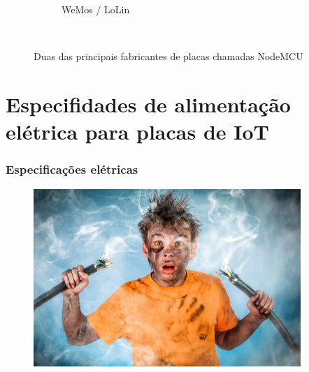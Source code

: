 \documentclass{beamer}
\begin{document}
\begin{frame}
\begin{minipage}{\textwidth}
\begin{figure}
\begin{subfigure}[b]{0.25\textwidth}
			\caption{WeMos / LoLin}
			\label{fig:node_mcudf}
		\end{subfigure}
		~ %
		\caption{Duas das principais fabricantes de placas chamadas NodeMCU}\label{fig:placa_sdfsiot}
		\vspace{-20pt}
	\end{figure}
	
	
\end{minipage}
\end{frame} 



\section{Especifidades de alimentação elétrica para placas de IoT}


\begin{frame}
\frametitle{Especificações elétricas}
\begin{minipage}{\textwidth}
	
		\begin{figure}[!ht]
			\centering
			\includegraphics[width=0.9\textwidth]{menino-choque.jpg}
			\label{fig:ndfgodsdfsde_power_pins}
			\vspace{-10pt}
		\end{figure}

\end{minipage}
\end{frame} 
\end{document}
